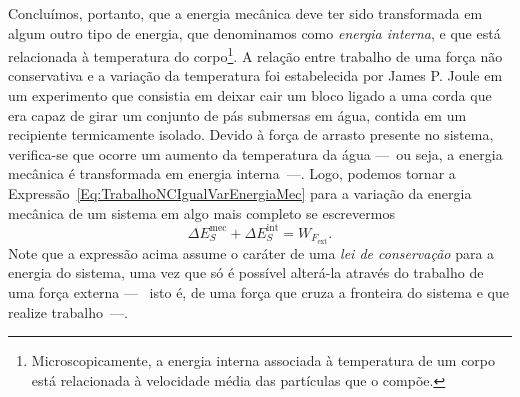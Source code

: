Concluímos, portanto, que a energia mecânica deve ter sido transformada em algum outro tipo de energia, que denominamos como \emph{energia interna}, e que está relacionada à temperatura do corpo\footnote{Microscopicamente, a energia interna associada à temperatura de um corpo está relacionada à velocidade média das partículas que o compõe.}. A relação entre trabalho de uma força não conservativa e a variação da temperatura foi estabelecida por James P. Joule em um experimento que consistia em deixar cair um bloco ligado a uma corda que era capaz de girar um conjunto de pás submersas em água, contida em um recipiente termicamente isolado. Devido à força de arrasto presente no sistema, verifica-se que ocorre um aumento da temperatura da água ---~ou seja, a energia mecânica é transformada em energia interna~---. Logo, podemos tornar a Expressão~\eqref{Eq:TrabalhoNCIgualVarEnergiaMec} para a variação da energia mecânica de um sistema em algo mais completo se escrevermos
\begin{equation}\label{Eq:ConservacaoDaEnergia1}
    \Delta E_S^{\textrm{mec}} + \Delta E_S^{\textrm{int}} = W_{F_{\textrm{ext}}}.
\end{equation}
%
Note que a expressão acima assume o caráter de uma \emph{lei de conservação} para a energia do sistema, uma vez que só é possível alterá-la através do trabalho de uma força externa ---~ isto é, de uma força que cruza a fronteira do sistema e que realize trabalho~---.

